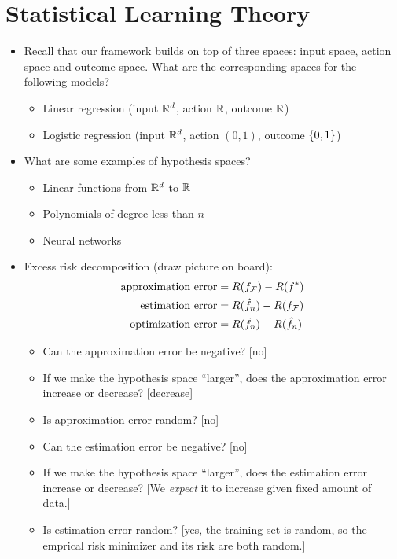 \documentclass[11pt]{article}
\begin{document}
\section{Statistical Learning Theory}
\begin{itemize}
\item Recall that our framework builds on top of three spaces: input space, action space and outcome space. What are the corresponding spaces for the following models?
\begin{itemize}
\item Linear regression (input $\mathbb{R}^d$, action $\mathbb{R}$, outcome $\mathbb{R}$)
\item Logistic regression (input $\mathbb{R}^d$, action $(0, 1)$, outcome $\left\{ 0, 1 \right\}$)
\end{itemize}

\item What are some examples of hypothesis spaces?
\begin{itemize}
\item Linear functions from $\mathbb{R}^d$ to $\mathbb{R}$
\item Polynomials of degree less than $n$
\item Neural networks
\end{itemize}

\item Excess risk decomposition (draw picture on board):
\begin{align}
\text{approximation error} &= R(f_{\mathcal{F}}) - R(f^*) \\
\text{estimation error} &= R(\hat{f}_n) - R(f_{\mathcal{F}}) \\
\text{optimization error} &= R(\tilde{f}_n) - R(\hat{f}_n)
\end{align}
\begin{itemize}
\item Can the approximation error be negative? [no]
\item If we make the hypothesis space ``larger'', does the approximation error increase or decrease? [decrease]
\item Is approximation error random? [no]

\item Can the estimation error be negative? [no] 
\item If we make the hypothesis space ``larger'', does the estimation error increase or decrease? [We \emph{expect} it to increase given fixed amount of data.]
\item Is estimation error random? [yes, the training set is random, so the emprical risk minimizer and its risk are both random.] 


\end{itemize}
\end{itemize}
\end{document}
